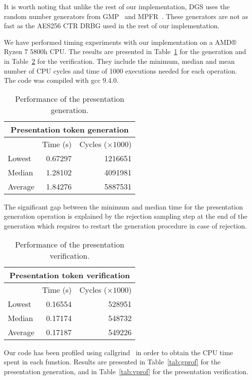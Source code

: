 It is worth noting that unlike the rest of our implementation, DGS uses the random number generators from GMP~\cite{gmp} and MPFR~\cite{mpfr}. These generators are not as fast as the AES256 CTR DRBG used in the rest of our implementation.

We have performed timing experiments with our implementation on a AMD® Ryzen 7 5800h CPU. The results are presented in Table~\ref{tab:gperf} for the generation and in Table~\ref{tab:vperf} for the verification. They include the minimum, median and mean number of CPU cycles and time of 1000 executions needed for each operation. The code was compiled with gcc 9.4.0.

\begin{table}[h!]
\centering
\caption{Performance of the presentation generation.}
\label{tab:gperf}
\begin{tabular}{lrr}
\toprule
\multicolumn{3}{c}{\textbf{Presentation token generation}} \\
\midrule
 & Time (s) & Cycles ($\times 1000$) \\
\midrule
Lowest  & 0.67297  & 1216651  \\
Median  & 1.28102  & 4091981  \\
Average & 1.84276  & 5887531  \\
\bottomrule
\end{tabular}
\end{table}

The significant gap between the minimum and median time for the presentation generation operation is explained by the rejection sampling step at the end of the generation which requires to restart the generation procedure in case of rejection.

\begin{table}[h!]
\centering
\caption{Performance of the presentation verification.}
\label{tab:vperf}
\begin{tabular}{lrr}
\toprule
\multicolumn{3}{c}{\textbf{Presentation token verification}} \\
\midrule
 & Time (s) & Cycles ($\times 1000$) \\
\midrule
Lowest  & 0.16554  & 528951  \\
Median  & 0.17174  & 548732  \\
Average & 0.17187  & 549226  \\
\bottomrule
\end{tabular}
\end{table}

Our code has been profiled using callgrind~\cite{callgrind} in order to obtain the CPU time spent in each funstion. Results are presented in Table~\ref{tab:gprof} for the presentation generation, and in Table~\ref{tab:vprof} for the presentation verification.


